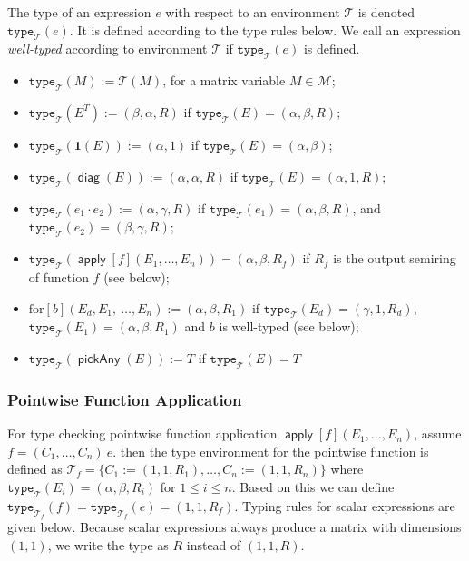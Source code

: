 \documentclass{article}
\DeclareMathOperator{\pickAny}{\mathsf{pickAny}}
\newcommand{\tenv}{\mathcal{T}}
\newcommand{\ttypet}{\texttt{type}_{\tenv}}
\newcommand{\transp}[1]{#1^T}
\newcommand{\rowdom}{\mathbf{1}}
\DeclareMathOperator{\diag}{\mathsf{diag}}
\DeclareMathOperator{\Apply}{\mathsf{apply}}
\newcommand{\ttype}{\texttt{type}}
\newcommand{\Mnam}{\mathcal{M}}
\begin{document}
The type of an expression $e$ with respect to an environment $\tenv$ is denoted $\ttype_{\tenv}(e)$.
It is defined according to the type rules below.
We call an expression \emph{well-typed} according to environment $\tenv$ if $\ttype_{\tenv}(e)$ is defined.

\begin{itemize}
    \item $\ttypet(M):= \tenv(M)$, for a matrix variable $M\in\Mnam$;
    \item $\ttypet(\transp{E}):= (\beta,\alpha,R)$ if $\ttypet(E)=(\alpha,\beta,R)$;
    \item $\ttypet(\rowdom(E)):= (\alpha,1)$ if $\ttypet(E)=(\alpha,\beta)$;
    \item $\ttypet(\diag(E)):= (\alpha,\alpha,R)$ if $\ttypet(E)=(\alpha,1,R)$;
    \item $\ttypet(e_1 \cdot e_2):= (\alpha,\gamma,R)$ if  $\ttypet(e_1)=(\alpha,\beta,R)$, and $\ttypet(e_2)=(\beta,\gamma,R)$;
    \item $\ttypet(\Apply[f](E_1,\ldots,E_n)) = (\alpha,\beta,R_f)$ if $R_f$ is the output semiring of function $f$ (see below);
    \item $\text{for}[b](E_d, E_1,\ \ldots,E_n) := (\alpha, \beta, R_1)$ if $\ttypet(E_d) = (\gamma, 1, R_d)$, \\$\ttypet(E_1) = (\alpha, \beta, R_1)$ and $b$ is well-typed (see below);
    \item $\ttypet(\pickAny(E)) := T$ if $\ttypet(E) = T$
\end{itemize}

\subsubsection*{Pointwise Function Application}
For type checking pointwise function application $\Apply[f](E_1,\ldots,E_n)$, assume $f = (C_1,\ldots,C_n)\ e$.
then the type environment for the pointwise function is defined as $\tenv_f = \{ C_1 := (1, 1, R_1),\ldots, C_n := (1, 1, R_n) \}$ where $\ttypet(E_i) = (\alpha, \beta, R_i)$ for $1 \leq i \leq n$.
Based on this we can define $\ttype_{\tenv_f}(f) = \ttype_{\tenv_f}(e) = (1, 1, R_f)$.
Typing rules for scalar expressions are given below.
Because scalar expressions always produce a matrix with dimensions $(1, 1)$, we write the type as $R$ instead of $(1, 1, R)$.
\end{document}
